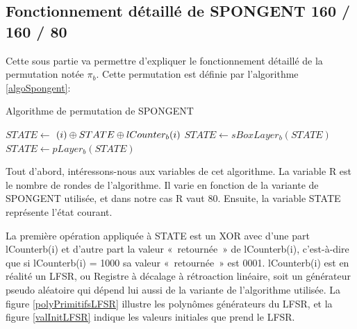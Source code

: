 \subsection{Fonctionnement détaillé de SPONGENT 160 / 160 / 80}

Cette sous partie va permettre d'expliquer le fonctionnement détaillé de la
permutation notée $\pi_{b}$. Cette permutation est définie par l'algorithme
\ref{algoSpongent}:

\begin{algorithm}
	\caption{Algorithme de permutation de SPONGENT}
	\label{algoSpongent}
	\begin{algorithmic}
		\STATE $ STATE \leftarrow $ $(i) \mathbin{\oplus} STATE \mathbin{\oplus} lCounter_{b}(i)$
		\STATE $ STATE \leftarrow sBoxLayer_{b}(STATE)$
		\STATE $ STATE \leftarrow pLayer_{b}(STATE)$
		\ENDFOR
	\end{algorithmic}
\end{algorithm}

Tout d'abord, intéressons-nous aux variables de cet algorithme. La
variable R est le nombre de rondes de l'algorithme. Il varie en fonction
de la variante de SPONGENT utilisée, et dans notre cas R vaut 80. Ensuite,
la variable STATE représente l'état courant.

La première opération appliquée à STATE est un XOR avec d'une part
lCounterb(i) et d'autre part la valeur « retournée » de lCounterb(i),
c'est-à-dire que si lCounterb(i) = 1000 sa valeur « retournée » est 0001.
lCounterb(i) est en réalité un LFSR, ou Registre à décalage à rétroaction
linéaire, soit un générateur pseudo aléatoire qui dépend lui aussi de la
variante de l'algorithme utilisée. La figure \ref{polyPrimitifsLFSR}
illustre les polynômes générateurs du LFSR, et la figure \ref{valInitLFSR}
indique les valeurs initiales que prend le LFSR.

